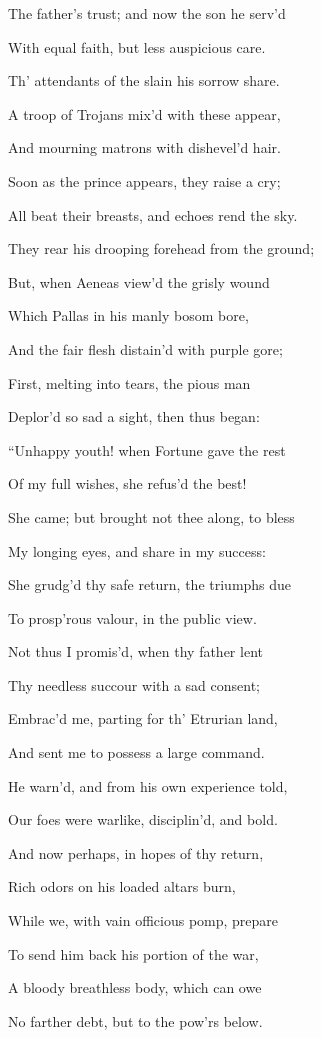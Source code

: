 The father’s trust; and now the son he serv’d

With equal faith, but less auspicious care.

Th’ attendants of the slain his sorrow share.

A troop of Trojans mix’d with these appear,

And mourning matrons with dishevel’d hair.

Soon as the prince appears, they raise a cry;

All beat their breasts, and echoes rend the sky.

They rear his drooping forehead from the ground;

But, when Aeneas view’d the grisly wound

Which Pallas in his manly bosom bore,

And the fair flesh distain’d with purple gore;

First, melting into tears, the pious man

Deplor’d so sad a sight, then thus began:

“Unhappy youth! when Fortune gave the rest

Of my full wishes, she refus’d the best!

She came; but brought not thee along, to bless

My longing eyes, and share in my success:

She grudg’d thy safe return, the triumphs due

To prosp’rous valour, in the public view.

Not thus I promis’d, when thy father lent

Thy needless succour with a sad consent;

Embrac’d me, parting for th’ Etrurian land,

And sent me to possess a large command.

He warn’d, and from his own experience told,

Our foes were warlike, disciplin’d, and bold.

And now perhaps, in hopes of thy return,

Rich odors on his loaded altars burn,

While we, with vain officious pomp, prepare

To send him back his portion of the war,

A bloody breathless body, which can owe

No farther debt, but to the pow’rs below.

